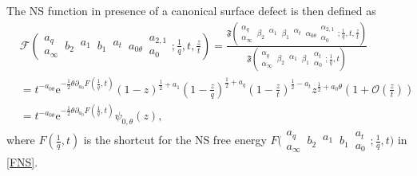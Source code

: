 \documentclass[11pt]{article}
\numberwithin{equation}{section}
\newcommand{\E}{{\mathrm e}}
\newcommand{\FIVc}[9]{F\bigg( \begin{matrix} #2 \\ #1 \end{matrix} \, #3 \, \begin{matrix} #4  \\ \, \end{matrix} \,#5 \, \begin{matrix} #6 \\ #7 \end{matrix} ; #8, #9 \bigg)}
\begin{document}
%
The NS function in presence of a canonical surface defect is then defined as
%
\begin{equation}\label{semist}
\begin{aligned}
&\mathcal{F}\left(\begin{matrix}a_q\\ a_{\infty}\end{matrix}\,b_2\,\begin{matrix}a_1\\ {}\end{matrix}\,b_1\,\begin{matrix} a_t\\ {}\end{matrix}\,a_{0\theta}\,\begin{matrix}a_{2,1}\\ a_{0}\end{matrix};\frac{1}{q},t,\frac{z}{t}\right)=\frac{\mathfrak{F}\left(\begin{matrix}\alpha_q\\ \alpha_{\infty}\end{matrix}\,\beta_2\,\begin{matrix}\alpha_1\\ {}\end{matrix}\,\beta_1\,\begin{matrix}\alpha_t\\ {}\end{matrix}\,\alpha_{0\theta}\,\begin{matrix}\alpha_{2,1}\\ \alpha_{0}\end{matrix};\frac{1}{q},t,\frac{z}{t}\right)}{\mathfrak{F}\left(\begin{matrix}\alpha_q\\ \alpha_{\infty}\end{matrix}\,\beta_2\,\begin{matrix}\alpha_1\\ {}\end{matrix}\,\beta_1\,\begin{matrix}\alpha_t\\ \alpha_{0}\end{matrix};\frac{1}{q},t\right)}\\
    &=t^{-a_{0\theta} }\E^{-\frac1 2\theta\partial_{a_0}F\left(\frac1 q , t\right)}(1-z)^{\frac{1}{2}+a_1}\left(1-\frac z q\right)^{\frac1 2 +a_q}\left(1-\frac z t\right)^{\frac 1 2 -a_t}z^{\frac1 2+a_0 \theta}\left(1+\mathcal O\left(\frac{z}{t}\right)\right)\\
    &= t^{-a_{0\theta} }\E^{-\frac1 2\theta\partial_{a_0}F\left(\frac1 q , t\right)} \psi_{0,\theta}(z),
\end{aligned}
\end{equation}
where $F\left(\frac1 q , t\right)$ is the shortcut for the NS free energy $\FIVc{a_{\infty}}{a_{q}}{b_2}{a_1}{b_1}{a_t}{a_0}{\frac{1}{q}}{t}$ in \eqref{FNS}.
\end{document}
